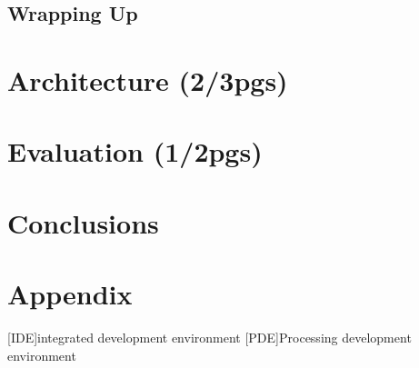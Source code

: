 \documentclass{./llncs2e/llncs}
\begin{document}
\subsection{Wrapping Up}

\section{Architecture (2/3pgs)}

\section{Evaluation (1/2pgs)}

\section{Conclusions}

\newpage
\appendix
\section{Appendix}
\label{sec:attachments}

\begin{acronym}
[IDE]{integrated development environment}
[PDE]{Processing development environment}
\end{acronym}

% 
% 
 

 
\end{document}
